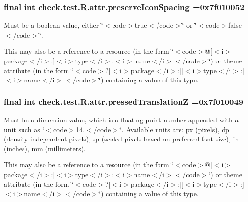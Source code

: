 \subsubsection[{preserve\+Icon\+Spacing}]{\setlength{\rightskip}{0pt plus 5cm}final int check.\+test.\+R.\+attr.\+preserve\+Icon\+Spacing =0x7f010052\hspace{0.3cm}{\ttfamily [static]}}\label{classcheck_1_1test_1_1_r_1_1attr_ae85e01112339734f60777fb376eb7e67}
Must be a boolean value, either \char`\"{}$<$code$>$true$<$/code$>$\char`\"{} or \char`\"{}$<$code$>$false$<$/code$>$\char`\"{}. 

This may also be a reference to a resource (in the form \char`\"{}$<$code$>$@\mbox{[}$<$i$>$package$<$/i$>$\+:\mbox{]}$<$i$>$type$<$/i$>$\+:$<$i$>$name$<$/i$>$$<$/code$>$\char`\"{}) or theme attribute (in the form \char`\"{}$<$code$>$?\mbox{[}$<$i$>$package$<$/i$>$\+:\mbox{]}\mbox{[}$<$i$>$type$<$/i$>$\+:\mbox{]}$<$i$>$name$<$/i$>$$<$/code$>$\char`\"{}) containing a value of this type. \hypertarget{classcheck_1_1test_1_1_r_1_1attr_a7e7386a063e1333f5af03bd54faff84f}{}
\subsubsection[{pressed\+Translation\+Z}]{\setlength{\rightskip}{0pt plus 5cm}final int check.\+test.\+R.\+attr.\+pressed\+Translation\+Z =0x7f010049\hspace{0.3cm}{\ttfamily [static]}}\label{classcheck_1_1test_1_1_r_1_1attr_a7e7386a063e1333f5af03bd54faff84f}
Must be a dimension value, which is a floating point number appended with a unit such as \char`\"{}$<$code$>$14.\+5sp$<$/code$>$\char`\"{}. Available units are\+: px (pixels), dp (density-\/independent pixels), sp (scaled pixels based on preferred font size), in (inches), mm (millimeters). 

This may also be a reference to a resource (in the form \char`\"{}$<$code$>$@\mbox{[}$<$i$>$package$<$/i$>$\+:\mbox{]}$<$i$>$type$<$/i$>$\+:$<$i$>$name$<$/i$>$$<$/code$>$\char`\"{}) or theme attribute (in the form \char`\"{}$<$code$>$?\mbox{[}$<$i$>$package$<$/i$>$\+:\mbox{]}\mbox{[}$<$i$>$type$<$/i$>$\+:\mbox{]}$<$i$>$name$<$/i$>$$<$/code$>$\char`\"{}) containing a value of this type. \hypertarget{classcheck_1_1test_1_1_r_1_1attr_a48d0f556721f22983ce0941643a36463}{}
